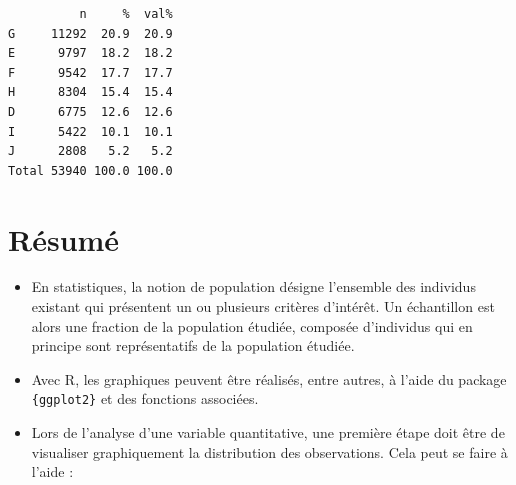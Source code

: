 \documentclass[
  letterpaper,
]{book}
\begin{document}
\begin{verbatim}
          n     %  val%
G     11292  20.9  20.9
E      9797  18.2  18.2
F      9542  17.7  17.7
H      8304  15.4  15.4
D      6775  12.6  12.6
I      5422  10.1  10.1
J      2808   5.2   5.2
Total 53940 100.0 100.0
\end{verbatim}

\section{Résumé}\label{ruxe9sumuxe9-2}

\begin{itemize}
\item
  En statistiques, la notion de population désigne l'ensemble des
  individus existant qui présentent un ou plusieurs critères d'intérêt.
  Un échantillon est alors une fraction de la population étudiée,
  composée d'individus qui en principe sont représentatifs de la
  population étudiée.
\item
  Avec R, les graphiques peuvent être réalisés, entre autres, à l'aide
  du package \texttt{\{ggplot2\}} et des fonctions associées.
\item
  Lors de l'analyse d'une variable quantitative, une première étape doit
  être de visualiser graphiquement la distribution des observations.
  Cela peut se faire à l'aide :


\end{itemize}
\end{document}
